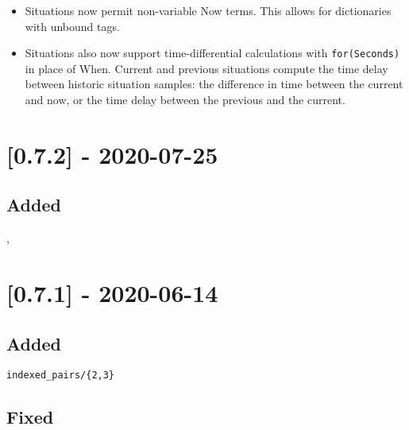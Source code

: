 \begin{itemize}
    \item Situations now permit non-variable Now terms. This allows for dictionaries
with unbound tags.
    \item Situations also now support time-differential calculations with \verb$for(Seconds)$
in place of When. Current and previous situations compute the time delay
between historic situation samples: the difference in time between the current
and now, or the time delay between the previous and the current.
\end{itemize}

\section{[0.7.2] - 2020-07-25}

\subsection{Added}

\begin{shortlist}
    \item {}
    \item {}
    \item {}
    \item {}, 
\end{shortlist}

\section{[0.7.1] - 2020-06-14}

\subsection{Added}

\begin{shortlist}
    \item \verb$indexed_pairs/{2,3}$
    \item {}
    \item {}
    \item {}
\end{shortlist}

\subsection{Fixed}

